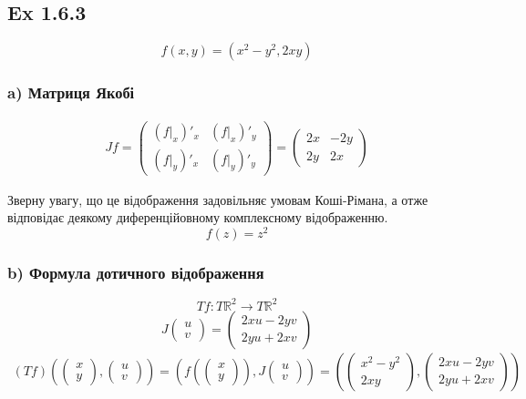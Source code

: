 \documentclass[10pt, a4paper]{article} %
\newcommand{\R}{\mathbb{R}}
\begin{document}
\subsection*{Ex 1.6.3}
\[f(x,y) = (x^2-y^2, 2xy)\]
\subsubsection*{a) Матриця Якобі}
\begin{align*}
    Jf = \begin{pmatrix}
        (f|_x)'_x & (f|_x)'_y\\
        (f|_y)'_x & (f|_y)'_y
    \end{pmatrix} 
    = \begin{pmatrix}
        2x & -2y\\
        2y & 2x
    \end{pmatrix}
\end{align*}

Зверну увагу, що це відображення задовільняє умовам Коші-Рімана, а отже відповідає деякому диференційовному комплексному відображенню.
\[f(z)=z^2\]

\subsubsection*{b) Формула дотичного відображення}
\[Tf : T\R^2 \to T\R^2\]
\[J\begin{pmatrix}u\\v\end{pmatrix} = \begin{pmatrix}2xu-2yv\\2yu+2xv\end{pmatrix}\]
\begin{align*}
    (Tf)\left(\begin{pmatrix}x\\y\end{pmatrix} , \begin{pmatrix}u\\v\end{pmatrix}\right)
    = \left(f(\begin{pmatrix}x\\y\end{pmatrix}) , J\begin{pmatrix}u\\v\end{pmatrix}\right)
    = \left(\begin{pmatrix}x^2-y^2 \\ 2xy\end{pmatrix} , \begin{pmatrix}2xu-2yv\\2yu+2xv\end{pmatrix}\right)
\end{align*}
\end{document}
